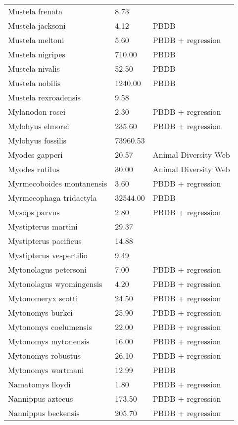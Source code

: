 \begin{longtable}{p{} p{} p{}}
    Mustela frenata & 8.73 & \cite{Smith2004} \\ 
    Mustela jacksoni & 4.12 & PBDB \\ 
    Mustela meltoni & 5.60 & PBDB + regression \\ 
    Mustela nigripes & 710.00 & PBDB \\ 
    Mustela nivalis & 52.50 & PBDB \\ 
    Mustela nobilis & 1240.00 & PBDB \\ 
    Mustela rexroadensis & 9.58 & \cite{Tomiya2013} \\ 
    Mylanodon rosei & 2.30 & PBDB + regression \\ 
    Mylohyus elmorei & 235.60 & PBDB + regression \\ 
    Mylohyus fossilis & 73960.53 & \cite{Brook2004a} \\ 
    Myodes gapperi & 20.57 & Animal Diversity Web \\ 
    Myodes rutilus & 30.00 & Animal Diversity Web \\ 
    Myrmecoboides montanensis & 3.60 & PBDB + regression \\ 
    Myrmecophaga tridactyla & 32544.00 & PBDB \\ 
    Mysops parvus & 2.80 & PBDB + regression \\ 
    Mystipterus martini & 29.37 & \cite{Tomiya2013} \\ 
    Mystipterus pacificus & 14.88 & \cite{Tomiya2013} \\ 
    Mystipterus vespertilio & 9.49 & \cite{Tomiya2013} \\ 
    Mytonolagus petersoni & 7.00 & PBDB + regression \\ 
    Mytonolagus wyomingensis & 4.20 & PBDB + regression \\ 
    Mytonomeryx scotti & 24.50 & PBDB + regression \\ 
    Mytonomys burkei & 25.90 & PBDB + regression \\ 
    Mytonomys coelumensis & 22.00 & PBDB + regression \\ 
    Mytonomys mytonensis & 16.00 & PBDB + regression \\ 
    Mytonomys robustus & 26.10 & PBDB + regression \\ 
    Mytonomys wortmani & 12.99 & PBDB \\ 
    Namatomys lloydi & 1.80 & PBDB + regression \\ 
    Nannippus aztecus & 173.50 & PBDB + regression \\ 
    Nannippus beckensis & 205.70 & PBDB + regression \\ 

\end{longtable}
